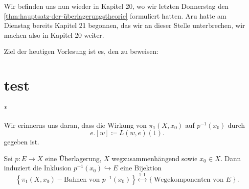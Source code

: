 
\setcounter{section}{20}
\setcounter{mkessler@fancythm@dummy}{4}
\setcounter{mkessler@fancythm@smalldummy}{11}


\begin{remark*}[Nummerierung]
    Wir befinden uns nun wieder in Kapitel 20, wo wir letzten Donnerstag den \autoref{thm:hauptsatz-der-überlagerungstheorie} formuliert hatten. Aru hatte am Dienstag bereits Kapitel 21 begonnen, das wir an dieser Stelle unterbrechen, wir machen also in Kapitel 20 weiter.
\end{remark*}

Ziel der heutigen Vorlesung ist es, den  zu beweisen:

\providecommand\ThmHauptsatzUeberlagerungstheorie{\section{test}}
\ThmHauptsatzUeberlagerungstheorie*

Wir erinnerns uns daran, dass die Wirkung von $\pi_1(X,x_0)$ auf $p^{-1} (x_0)$ durch
\[
    e.[w] \coloneqq  L(w,e)(1)
.\] 
gegeben ist.


\begin{proposition}
    Sei $p\colon E\to X$ eine Überlagerung,  $X$ wegzusammenhängend sowie  $x_0\in X$. Dann induziert die Inklusion $p^{-1} (x_0) \hookrightarrow E$ eine Bijektion
    \[
        \left \{\pi_1(X,x_0) - \text{Bahnen von } p^{-1} (x_0) \right\}  \stackrel{1:1}{\longleftrightarrow} \left \{\text{Wegekomponenten von } E\right\} 
    .\] 
\end{proposition}

